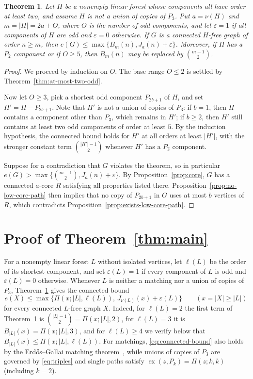 \documentclass[10pt]{article}
\theoremstyle{compactplain}
\newtheorem{theorem}{Theorem}[section]
\theoremstyle{remark}\newtheorem{remark}[theorem]{Remark}
\newcommand{\ex}{\operatorname{ex}}
\begin{document}
\begin{theorem}\label{thm:connected}
Let $H$ be a nonempty linear forest whose components all have order at
least two, and assume $H$ is not a union of copies of $P_3$. Put
$a=\nu(H)$ and $m=|H|=2a+O$, where $O$ is the number of odd components,
and let $\varepsilon=1$ if all components of $H$ are odd and
$\varepsilon=0$ otherwise. If $G$ is a connected $H$-free graph of order
$n\ge m$, then $e(G)\le\max\{B_m(n),J_a(n)+\varepsilon\}$. Moreover, if
$H$ has a $P_2$ component or if $O\ge5$, then $B_m(n)$ may be replaced
by $\binom{m-1}{2}$.
\end{theorem}
\begin{proof}
We proceed by induction on $O$. The base range $O\le2$ is settled by
Theorem~\ref{thm:at-most-two-odd}.

Now let $O\ge3$, pick a shortest odd component $P_{2b+1}$ of $H$, and
set $H'=H-P_{2b+1}$. Note that $H'$ is not a union of copies of $P_3$:
if $b=1$, then $H$ contains a component other than $P_3$, which remains
in $H'$; if $b\ge2$, then $H'$ still contains at least two odd
components of order at least $5$. By the induction hypothesis, the
connected bound holds for $H'$ at all orders at least $|H'|$, with the
stronger constant term $\binom{|H'|-1}{2}$ whenever $H'$ has a $P_2$
component.

Suppose for a contradiction that $G$ violates the theorem, so in
particular $e(G)>\max\{\binom{m-1}{2},J_a(n)+\varepsilon\}$. By
Proposition~\ref{prop:core}, $G$ has a connected $a$-core $R$ satisfying
all properties listed there. Proposition~\ref{prop:no-low-core-path}
then implies that no copy of $P_{2b+1}$ in $G$ uses at most $b$ vertices
of $R$, which contradicts Proposition~\ref{prop:exists-low-core-path}.
\end{proof}

\section{Proof of Theorem~\ref{thm:main}}\label{sec:main}

For a nonempty linear forest $L$ without isolated vertices, let
$\ell(L)$ be the order of its shortest component, and set
$\varepsilon(L)=1$ if every component of $L$ is odd and
$\varepsilon(L)=0$ otherwise. Whenever $L$ is neither a matching nor a
union of copies of $P_3$, Theorem~\ref{thm:connected} gives the
connected bound
\begin{equation}\label{eq:connected-bound}
 e(X)\le\max\bigl\{\Pi(x;|L|,\ell(L)),\,J_{\nu(L)}(x)+\varepsilon(L)\bigr\}
 \qquad(x=|X|\ge|L|)
\end{equation}
for every connected $L$-free graph $X$. Indeed, for $\ell(L)=2$ the
first term of Theorem~\ref{thm:connected} is $\binom{|L|-1}{2}=\Pi(x;|L|,2)$,
for $\ell(L)=3$ it is $B_{|L|}(x)=\Pi(x;|L|,3)$, and for $\ell(L)\ge4$
we verify below that $B_{|L|}(x)\le\Pi(x;|L|,\ell(L))$. For matchings,
\eqref{eq:connected-bound} also holds by the Erd\H{o}s--Gallai matching
theorem~\cite{EG}, while unions of copies of $P_3$ are governed by
\eqref{eq:triples} and single paths satisfy
$\ex(z,P_k)=\Pi(z;k,k)$ (including $k=2$).
\end{document}
